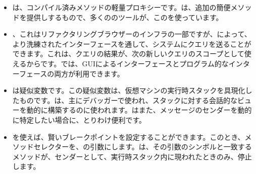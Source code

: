 \documentclass[a4paper,10pt,twoside]{book}
\begin{document}
\begin{itemize}
\item {}は、コンパイル済みメソッドの軽量プロキシーです。は、追加の簡便メソッドを提供しするもので、多くの\st{}のツールが、このを使っています。
\item {}、これはリファクタリングブラウザーのインフラの一部ですが、によって、より洗練されたインターフェースを通して、システムにクエリを送ることができます。これは、クエリの結果が、次の新しいクエリのスコープとして使えるからです。では、GUIによるインターフェースとプログラム的なインターフェースの両方が利用できます。%
\item {}は疑似変数です。この疑似変数は、仮想マシンの実行時スタックを具現化したものです。は、主にデバッガーで使われ、スタックに対する会話的なビューを動的に構築するのに使われます。はまた、メッセージのセンダーを動的に特定したい場合に、とりわけ便利です。%
\item {}を使えば、賢いブレークポイントを設定することができます。このとき、メソッドセレクターを、の引数にします。は、その引数のシンボルと一致するメソッドが、センダーとして、実行時スタック内に現われたときのみ、停止します。

\end{itemize}
\end{document}
